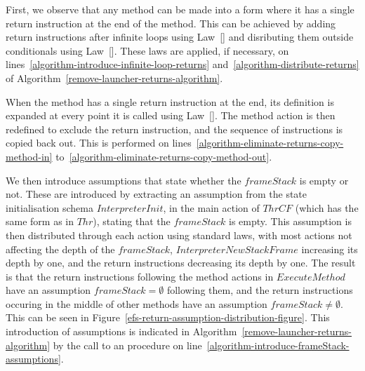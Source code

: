 First, we observe that any method can be made into a form where it has
a single return instruction at the end of the method.
This can be achieved by adding return instructions after infinite
loops using Law~[] and disributing them
outside conditionals using Law~[].
These laws are applied, if necessary, on
lines~\ref{algorithm-introduce-infinite-loop-returns}
and~\ref{algorithm-distribute-returns} of
Algorithm~\ref{remove-launcher-returns-algorithm}.

When the method has a single return instruction at the end, its
definition is expanded at every point it is called using
Law~[]. 
The method action is then redefined to exclude the return instruction,
and the sequence of instructions is copied back out.
This is performed on
lines~\ref{algorithm-eliminate-returns-copy-method-in}
to~\ref{algorithm-eliminate-returns-copy-method-out}.

We then introduce assumptions that state whether the $frameStack$ is
empty or not.
These are introduced by extracting an assumption from the state
initialisation schema $InterpreterInit$, in the main action of $ThrCF$
(which has the same form as in $Thr$), stating that the $frameStack$
is empty.
This assumption is then distributed through each action using standard
laws, with most actions not affecting the depth of the $frameStack$,
$InterpreterNewStackFrame$ increasing its depth by one, and the return
instructions decreasing its depth by one.
The result is that the return instructions following the method
actions in $ExecuteMethod$ have an assumption $frameStack = \emptyset$
following them, and the return instructions occuring in the middle of
other methods have an assumption $frameStack \neq \emptyset$.
This can be seen in
Figure~\ref{efs-return-assumption-distribution-figure}.
This introduction of assumptions is indicated in
Algorithm~\ref{remove-launcher-returns-algorithm} by the call to an
 procedure on
line~\ref{algorithm-introduce-frameStack-assumptions}.

